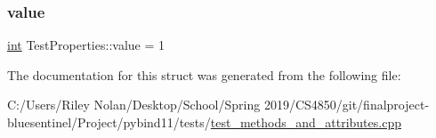 \mbox{\label{struct_test_properties_acf6cf3f369e46d611376a5b4c6054bc2}} 
\subsubsection{\texorpdfstring{value}{value}}
{\footnotesize\ttfamily \mbox{\hyperlink{warnings_8h_a74f207b5aa4ba51c3a2ad59b219a423b}{int}} Test\+Properties\+::value = 1}



The documentation for this struct was generated from the following file\+:\begin{DoxyCompactItemize}
\item 
C\+:/\+Users/\+Riley Nolan/\+Desktop/\+School/\+Spring 2019/\+C\+S4850/git/finalproject-\/bluesentinel/\+Project/pybind11/tests/\mbox{\hyperlink{test__methods__and__attributes_8cpp}{test\+\_\+methods\+\_\+and\+\_\+attributes.\+cpp}}\end{DoxyCompactItemize}
